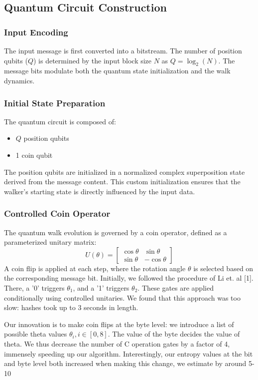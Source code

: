 \documentclass[conference]{IEEEtran}
\begin{document}
\subsection{Quantum Circuit Construction}

\subsubsection{Input Encoding}
The input message is first converted into a bitstream. The number of position qubits ($Q$) is determined by the input block size $N$ as $Q = \log_2(N)$. The message bits modulate both the quantum state initialization and the walk dynamics.

\subsubsection{Initial State Preparation}
The quantum circuit is composed of:
\begin{itemize}
    \item $Q$ position qubits
    \item 1 coin qubit
\end{itemize}
The position qubits are initialized in a normalized complex superposition state derived from the message content. This custom initialization ensures that the walker’s starting state is directly influenced by the input data.

\subsubsection{Controlled Coin Operator}
The quantum walk evolution is governed by a coin operator, defined as a parameterized unitary matrix:
\[
U(\theta) = \begin{bmatrix}
\cos \theta & \sin \theta \\
\sin \theta & -\cos \theta
\end{bmatrix}
\]
A coin flip is applied at each step, where the rotation angle $\theta$ is selected based on the corresponding message bit. Initially, we followed the procedure of Li et. al [1]. There, a '0' triggers $\theta_1$, and a '1' triggers $\theta_2$. These gates are applied conditionally using controlled unitaries. We found that this approach was too slow: hashes took up to 3 seconds in length. 

Our innovation is to make coin flips at the byte level: we introduce a list of possible theta values $\theta_i, i\in [0,8]$. The value of the byte decides the value of theta. We thus decrease the number of C operation gates by a factor of 4, immensely speeding up our algorithm. Interestingly, our entropy values at the bit and byte level both increased when making this change, we estimate by around 5-10%
\end{document}
